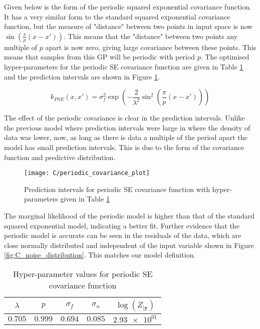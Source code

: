 \documentclass[11pt]{article}
\begin{document}
Given below is the form of the periodic squared exponential covariance function. It has a very similar form to the standard squared exponential covariance function, but the measure of "distance" between two points in input space is now $\sin(\frac{\pi}{p}(x-x'))$. This means that the "distance" between two points any multiple of $p$ apart is now zero, giving large covariance between these points. This means that samples from this GP will be periodic with period $p$. The optimised hyper-parameters for the periodic SE covariance function are given in Table \ref{table:C_periodic_covariance_hyper_parameters} and the prediction intervals are shown in Figure \ref{fig:C_periodic_covariance_prediction_intervals}.

\[k_{PSE}(x,x') = \sigma_f^2 \exp(-\frac{2}{\lambda^2}\sin^2(\frac{\pi}{p}(x-x')))\]

The effect of the periodic covariance is clear in the prediction intervals. Unlike the previous model where prediction intervals were large in where the density of data was lower, now, as long as there is data a multiple of the period apart the model has small prediction intervals. This is due to the form of the covariance function and predictive distribution.

\begin{figure}[h]
    \centering
    \texttt{[image: C/periodic\_covariance\_plot]}
    \caption{Prediction intervals for periodic SE covariance function with hyper-parameters given in Table \ref{table:C_periodic_covariance_hyper_parameters}}
    \label{fig:C_periodic_covariance_prediction_intervals}
\end{figure}

The marginal likelihood of the periodic model is higher than that of the standard squared exponential model, indicating a better fit. Further evidence that the periodic model is accurate can be seen in the residuals of the data, which are close normally distributed and independent of the input variable shown in Figure \ref{fig:C_noise_distribution}. This matches our model definition.

\begin{table}[h]
    \centering
    \small
    \begin{tabular}{|c|c|c|c|c|}
        \hline
        $\lambda$ & $p$ & $\sigma_f$ & $\sigma_n$ & $\log(Z_{|\textbf{y}})$ \\
        \hline
        $0.705$ & $0.999$ & $0.694$ & $0.085$ & $\num{2.93e+01}$ \\ 
        \hline
    \end{tabular}
    \caption{Hyper-parameter values for periodic SE covariance function}
    \label{table:C_periodic_covariance_hyper_parameters}
\end{table}
\end{document}
